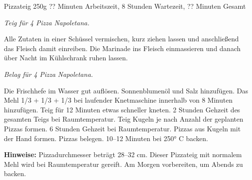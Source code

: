 \begin{recipe}{Pizzateig} {250g} {?? Minuten Arbeitszeit, 8 Stunden Wartezeit, ?? Minuten Gesamt}

  \freeform{}\textit{Teig für 4 Pizza Napoletana.}


  Alle Zutaten in einer Schüssel vermischen, kurz ziehen lassen und anschließend das Fleisch damit einreiben.
  Die Marinade ins Fleisch einmassieren und danach über Nacht im Kühlschrank ruhen lassen.

  \freeform{}\hrulefill{}

  \freeform{}\textit{Belag für 4 Pizza Napoletana.}


  Die Frischhefe im Wasser gut auflösen.
  Sonnenblumenöl und Salz hinzufügen.
  Das Mehl 1/3 + 1/3 + 1/3 bei laufender Knetmaschine innerhalb von 8 Minuten hinzufügen.
  Teig für 12 Minuten etwas schneller kneten.
  2 Stunden Gehzeit des gesamten Teigs bei Raumtemperatur.
  Teig Kugeln je nach Anzahl der geplanten Pizzas formen.
  6 Stunden Gehzeit bei Raumtemperatur.
  Pizzas aus Kugeln mit der Hand formen.
  Pizzas belegen.
  10–12 Minuten bei 250° C backen.

  \freeform{}\hrulefill{}

  \freeform{}\textbf{Hinweise:}
  Pizzadurchmesser beträgt 28–32 cm.
  Dieser Pizzateig mit normalem Mehl wird bei Raumtemperatur gereift.
  Am Morgen vorbereiten, um Abends zu backen.

\end{recipe}
